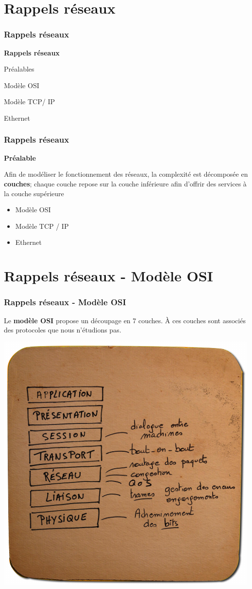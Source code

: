 \section{Rappels réseaux}

\begin{frame}[fragile]
  \frametitle{Rappels réseaux}
\begin{center}
	\Huge{\bf\color{blue}Rappels réseaux}
\end{center}
\begin{flushright}
  \item Préalables
  \item Modèle OSI
  \item Modèle TCP/ IP
  \item Ethernet
\end{flushright}
\end{frame}

\begin{frame}[fragile]
  \frametitle{Rappels réseaux}
{\bf\Large Préalable}

Afin de modéliser le fonctionnement des réseaux, la complexité est décomposée en
\textbf{couches}; chaque couche repose sur la couche inférieure afin d'offrir
des services à la couche supérieure
\begin{itemize}
	\item Modèle OSI
	\item Modèle TCP / IP
	\item Ethernet
\end{itemize}
\end{frame}


\section{Rappels réseaux - Modèle OSI}

\begin{frame}[fragile]
  \frametitle{Rappels réseaux - Modèle OSI}
Le \textbf{modèle OSI} propose un découpage en 7 couches. 
À ces couches sont associés des protocoles que nous n'étudions pas.

\begin{center}
	\includegraphics[width=.55\linewidth]{img/modele-osi-500x500.png}
\end{center}
\end{frame}

